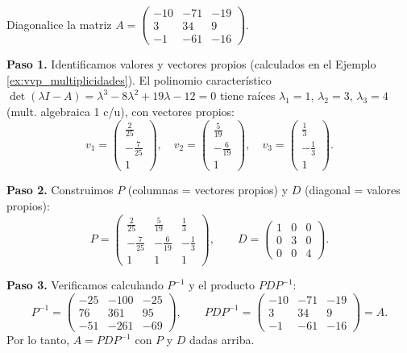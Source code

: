 \begin{example}
Diagonalice la matriz $A=\left(\begin{matrix}
-10 & -71 & -19 \\
3 & 34 & 9 \\
-1 & -61 & -16
\end{matrix}\right).$
\begin{myproof}
\textbf{Paso 1.} Identificamos valores y vectores propios (calculados en el Ejemplo \ref{ex:vvp_multiplicidades}). El polinomio característico $\det(\lambda I - A) = \lambda^3 - 8\lambda^2 + 19\lambda - 12 = 0$ tiene raíces $\lambda_1=1$, $\lambda_2=3$, $\lambda_3=4$ (mult. algebraica 1 c/u), con vectores propios:
\[
v_1 = \begin{pmatrix} \frac{2}{25} \\ -\frac{7}{25} \\ 1 \end{pmatrix}, \quad
v_2 = \begin{pmatrix} \frac{5}{19} \\ -\frac{6}{19} \\ 1 \end{pmatrix}, \quad
v_3 = \begin{pmatrix} \frac{1}{3} \\ -\frac{1}{3} \\ 1 \end{pmatrix}.
\]

\textbf{Paso 2.} Construimos $P$ (columnas = vectores propios) y $D$ (diagonal = valores propios):
\[
P = \begin{pmatrix}
\frac{2}{25} & \frac{5}{19} & \frac{1}{3} \\
-\frac{7}{25} & -\frac{6}{19} & -\frac{1}{3} \\
1 & 1 & 1
\end{pmatrix}, \qquad
D = \begin{pmatrix}
1 & 0 & 0 \\
0 & 3 & 0 \\
0 & 0 & 4
\end{pmatrix}.
\]

\textbf{Paso 3.} Verificamos calculando $P^{-1}$ y el producto $PDP^{-1}$:
\[
P^{-1} = \begin{pmatrix}
-25 & -100 & -25 \\
76 & 361 & 95 \\
-51 & -261 & -69
\end{pmatrix}, \qquad
PDP^{-1} = \begin{pmatrix}
-10 & -71 & -19 \\
3 & 34 & 9 \\
-1 & -61 & -16
\end{pmatrix} = A.
\]
Por lo tanto, $\boxed{A = PDP^{-1}}$ con $P$ y $D$ dadas arriba.
\end{myproof}
\end{example}


